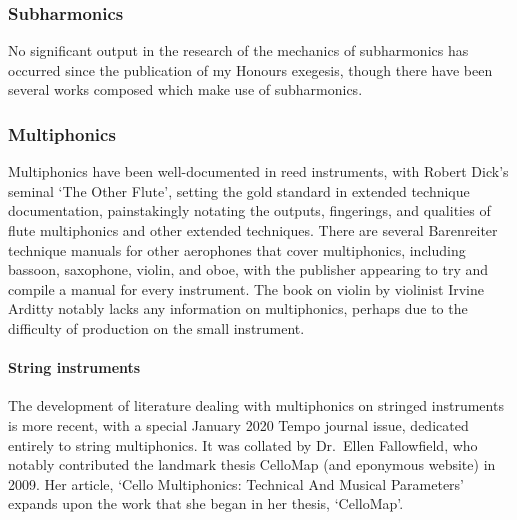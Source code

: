 \subsubsection{Subharmonics}
No significant output in the research of the mechanics of subharmonics has occurred since the publication of my Honours exegesis, though there have been several works composed which make use of subharmonics.\

\subsubsection{Multiphonics}
Multiphonics have been well-documented in reed instruments, with Robert Dick's seminal `The Other Flute', setting the gold standard in extended technique documentation, painstakingly notating the outputs, fingerings, and qualities of flute multiphonics and other extended techniques.\autocite{dickOtherFlute1989}
There are several Barenreiter technique manuals for other aerophones that cover multiphonics, including bassoon, saxophone, violin, and oboe, with the publisher appearing to try and compile a manual for every instrument.\autocite{weissTechniquesSaxophonePlaying2010,galloisTechniquesBassoonPlaying2009,ardittyTechniquesViolinPlaying2013, TODO:OboeBook}
The book on violin by violinist Irvine Arditty notably lacks any information on multiphonics, perhaps due to the difficulty of production on the small instrument.\autocite{ardittyTechniquesViolinPlaying2013}

\paragraph{String instruments}
The development of literature dealing with multiphonics on stringed instruments is more recent, with a special January 2020 Tempo journal issue, dedicated entirely to string multiphonics.
It was collated by Dr.\ Ellen Fallowfield, who notably contributed the landmark thesis CelloMap (and eponymous website) in 2009.\autocite{fallowfieldCelloMapHandbook2009, fallowfieldCelloMap}
Her article, `Cello Multiphonics: Technical And Musical Parameters' expands upon the work that she began in her thesis, `CelloMap'.\autocite{fallowfieldCelloMultiphonicsTechnical2020}

